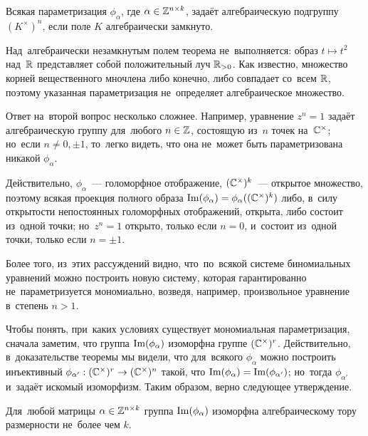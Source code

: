 \documentclass[a4paper,oneside]{article}
\begin{document}
\begin{theorem}
\label{theorem:AlgebraicityCondition}
  Всякая параметризация $\phi_\alpha$, где $\alpha \in \mathbb{Z}^{n \times k}$, задаёт алгебраическую подгруппу $(K^\times)^n$,
  если поле $K$ алгебраически замкнуто.
\end{theorem}

\begin{example*}
  Над~алгебраически незамкнутым полем теорема не~выполняется: образ $t \mapsto t^2$ над~$\mathbb{R}$
  представляет собой положительный луч $\mathbb{R}_{>0}$. Как известно, множество корней вещественного мночлена либо конечно,
  либо совпадает со~всем $\mathbb{R}$, поэтому указанная параметризация не~определяет алгебраическое множество.
\end{example*}

Ответ на~второй вопрос несколько сложнее. Например, уравнение $z^n = 1$ задаёт алгебраическую
группу для~любого $n \in \mathbb{Z}$, состоящую из~$n$ точек на~$\mathbb{C}^\times$; но~если $n \neq 0, \pm 1$,
то~легко видеть, что она не~может быть параметризована никакой $\phi_\alpha$.

Действительно, $\phi_\alpha$~— голоморфное отображение, $(\mathbb{C}^\times)^k$~— открытое множество,
поэтому всякая проекция полного образа $\mathrm{Im}(\phi_\alpha) = \phi_\alpha((\mathbb{C}^\times)^k)$ либо, в~силу
открытости непостоянных голоморфных отображений, открыта, либо состоит из~одной точки; но~$z^n = 1$
открыто, только если $n = 0$, и~состоит из~одной точки, только если $n = \pm 1$.

Более того, из~этих рассуждений видно, что~по~всякой системе биномиальных уравнений можно построить новую систему,
которая гарантированно не~параметризуется мономиально, возведя, например, произвольное уравнение в~степень $n > 1$.

Чтобы понять, при~каких условиях существует мономиальная параметризация, сначала заметим, что группа $\mathrm{Im}(\phi_\alpha)$
изоморфна группе $(\mathbb{C}^\times)^r$. Действительно, в~доказательстве теоремы мы видели, что для~всякого $\phi_\alpha$
можно построить инъективный $\phi_{\alpha'} : (\mathbb{C}^\times)^r \rightarrow (\mathbb{C}^\times)^n$ такой, что $\mathrm{Im}(\phi_\alpha) = \mathrm{Im}(\phi_{\alpha'})$;
но~тогда $\phi_{\alpha'}$ и~задаёт искомый изоморфизм. Таким образом, верно следующее утверждение.

\begin{statement*}
  Для~любой матрицы $\alpha \in \mathbb{Z}^{n \times k}$ группа $\mathrm{Im}(\phi_\alpha)$ изоморфна алгебраическому тору размерности не~более чем $k$.
\end{statement*}
\end{document}

